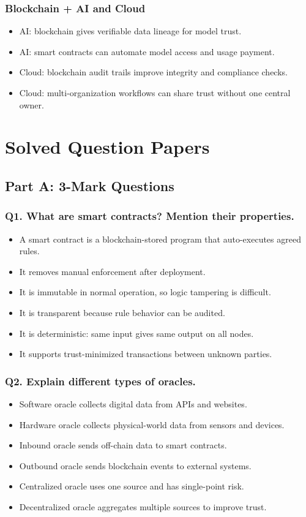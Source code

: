 \documentclass[12pt,a4paper]{article}
\begin{document}
\subsubsection*{Blockchain + AI and Cloud}
\begin{itemize}
\item AI: blockchain gives verifiable data lineage for model trust.
\item AI: smart contracts can automate model access and usage payment.
\item Cloud: blockchain audit trails improve integrity and compliance checks.
\item Cloud: multi-organization workflows can share trust without one central owner.
\end{itemize}

\section{Solved Question Papers}

\subsection{Part A: 3-Mark Questions}

\subsubsection*{Q1. What are smart contracts? Mention their properties.}
\begin{itemize}
\item A smart contract is a blockchain-stored program that auto-executes agreed rules.
\item It removes manual enforcement after deployment.
\item It is immutable in normal operation, so logic tampering is difficult.
\item It is transparent because rule behavior can be audited.
\item It is deterministic: same input gives same output on all nodes.
\item It supports trust-minimized transactions between unknown parties.
\end{itemize}

\subsubsection*{Q2. Explain different types of oracles.}
\begin{itemize}
\item Software oracle collects digital data from APIs and websites.
\item Hardware oracle collects physical-world data from sensors and devices.
\item Inbound oracle sends off-chain data to smart contracts.
\item Outbound oracle sends blockchain events to external systems.
\item Centralized oracle uses one source and has single-point risk.
\item Decentralized oracle aggregates multiple sources to improve trust.
\end{itemize}
\end{document}
